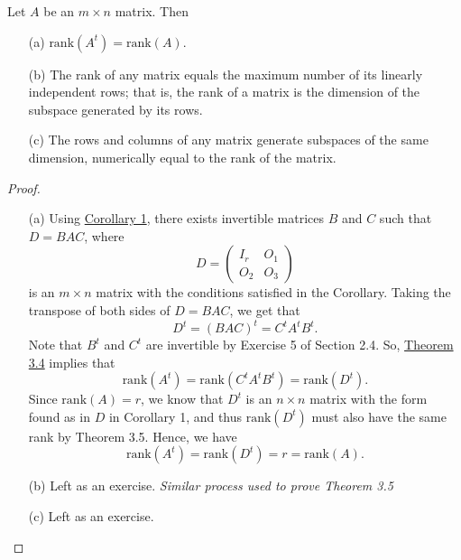 \begin{corollary}\label{Corollary 2 to Theorem 3.6}
    Let \( A  \) be an \( m \times n  \) matrix. Then  
    \begin{enumerate}
        \item[(a)] \( \text{rank}(A^{t}) = \text{rank}(A) \).
        \item[(b)] The rank of any matrix equals the maximum number of its linearly independent rows; that is, the rank of a matrix is the dimension of the subspace generated by its rows.
        \item[(c)] The rows and columns of any matrix generate subspaces of the same dimension, numerically equal to the rank of the matrix.
    \end{enumerate}
\end{corollary}    
\begin{proof}
\begin{enumerate}
    \item[(a)] Using {\hyperref[Corollary 1 to Theorem 3.6]{Corollary 1}}, there exists invertible matrices \( B  \) and \( C  \) such that \( D = BAC \), where 
        \[  D = \begin{pmatrix} 
            {I}_{r} & {O}_{1} \\
            {O}_{2} & {O}_{3}
                  \end{pmatrix}  \] is an \( m \times n  \) matrix with the conditions satisfied in the Corollary. Taking the transpose of both sides of \( D = BAC \), we get that
                  \[  D^{t} = (BAC)^{t} = {C}^{t} A^{t} B^{t}. \]
                  Note that \( B^{t}  \) and \( C^{t} \) are invertible by Exercise 5 of Section 2.4. So, {\hyperref[Theorem 3.4]{Theorem 3.4}} implies that  
                  \[  \text{rank}(A^{t}) = \text{rank}(C^{t} A^{t} B^{t}) = \text{rank}(D^{t}). \]
                  Since \( \text{rank}(A) = r  \), we know that \( D^{t} \) is an \( n \times n  \) matrix with the form found as in \( D  \) in Corollary 1, and thus \( \text{rank}(D^{t})  \) must also have the same rank by Theorem 3.5. Hence, we have
                  \[  \text{rank}(A^{t}) = \text{rank}(D^{t}) = r = \text{rank}(A). \]
        \item[(b)] Left as an exercise. \textit{Similar process used to prove Theorem 3.5} 
        \item[(c)] Left as an exercise.
\end{enumerate}
\end{proof}

